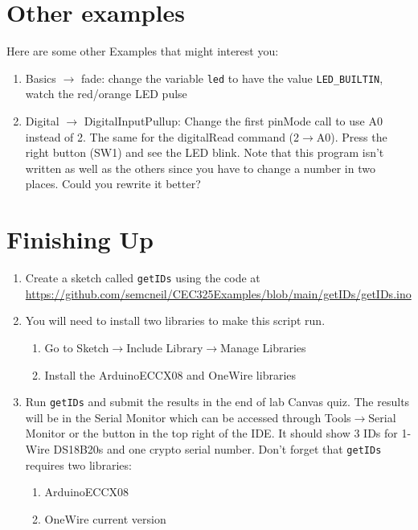 \section{Other examples}
	Here are some other Examples that might interest you:
	\begin{enumerate}
		\item Basics $\rightarrow$ fade: change the variable \lstinline|led| to have the value 
            \lstinline|LED_BUILTIN|, watch the red/orange LED pulse
		\item Digital $\rightarrow$ DigitalInputPullup: Change the first pinMode call to use A0 instead of 2. The same for 
				the digitalRead command (2$\rightarrow$A0). Press the right button (SW1) and see the LED blink. 
				 Note that this program isn't written as well as the others since you have to change a number in two
				places. Could you rewrite it better?
	\end{enumerate}

\section{Finishing Up}
  \begin{enumerate}
    \item Create a sketch called \lstinline$getIDs$ using the code at \\ 
        \href{https://github.com/semcneil/CEC325Examples/blob/main/getIDs/getIDs.ino}{https://github.com/semcneil/CEC325Examples/blob/main/getIDs/getIDs.ino}
    \item You will need to install two libraries to make this script run.
    \begin{enumerate}
        \item Go to Sketch$\rightarrow$Include Library$\rightarrow$Manage Libraries 
        \item Install the ArduinoECCX08 and OneWire libraries
    \end{enumerate}
    \item Run \lstinline$getIDs$ and submit the results in the end of lab Canvas quiz. The results will be 
                in the Serial Monitor which can be accessed through Tools$\rightarrow$Serial Monitor or the 
                button in the top right of the IDE. It should show 3 IDs for 1-Wire DS18B20s and one crypto serial 
                number. Don't forget that \lstinline$getIDs$ requires two libraries:
        \begin{enumerate}
            \item ArduinoECCX08
            \item OneWire current version
        \end{enumerate}
\end{enumerate}

